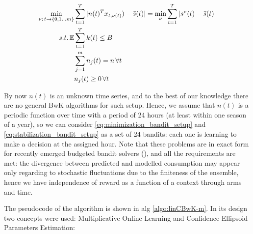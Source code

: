 \begin{align}    
    \begin{split}
    \label{eq:stabilization_bandit_setup}
    \min_{\nu:\, t \to \{0, 1\dots m\} }& \sum_{t=1}^T|n(t)^Tx_{t, \nu(t)}) - \bar s(t)| = \min_{\nu } \sum_{t=1}^T|s^\nu(t) - \bar s(t)|\\
     s.t. \operatorname{\mathbb{E}}& \sum_{t=1}^T k(t) \leq B \\
     & \sum_{j=1}^m n_j(t) = n\, \forall t \\
     & n_j(t) \geq 0\, \forall t
     \end{split}
\end{align}

By now $n(t)$ is an unknown time series, and to the best of our knowledge there are no general BwK algorithms for such setup. Hence, we assume that $n(t)$ is a periodic function over time with a period of 24 hours (at least within one season of a year), so we can consider \ref{eq:minimization_bandit_setup} and \ref{eq:stabilization_bandit_setup} as a set of 24 bandits: each one is learning to make a decision at the assigned hour. Note that these problems are in exact form for recently emerged budgeted bandit solvers (\cite{Agrawal2015}), and all the requirements are met: the divergence between predicted and modelled consumption may appear only regarding to stochastic fluctuations due to the finiteness of the ensemble, hence we have independence of reward as a function of a context through arms and time. 

The pseudocode of the algorithm is shown in alg \ref{algo:linCBwK-m}. In its design two concepts were used: Multiplicative Online Learning and Confidence Ellipsoid Parameters Estimation:

